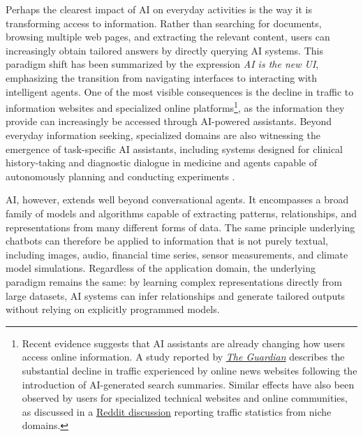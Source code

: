 Perhaps the clearest impact of AI on everyday activities is the way it is transforming access to information. Rather than searching for documents, browsing multiple web pages, and extracting the relevant content, users can increasingly obtain tailored answers by directly querying AI systems. This paradigm shift has been summarized by the expression \textit{AI is the new UI}, emphasizing the transition from navigating interfaces to interacting with intelligent agents. One of the most visible consequences is the decline in traffic to information websites and specialized online platforms\footnote{Recent evidence suggests that AI assistants are already changing how users access online information. A study reported by \href{https://www.theguardian.com/technology/2025/jul/24/ai-summaries-causing-devastating-drop-in-online-news-audiences-study-finds}{\textit{The Guardian}} describes the substantial decline in traffic experienced by online news websites following the introduction of AI-generated search summaries. Similar effects have also been observed by users for specialized technical websites and online communities, as discussed in a \href{https://www.reddit.com/r/ChatGPT/comments/1gklrkf/not_surprising_but_interesting_to_see_it}{Reddit discussion} reporting traffic statistics from niche domains.}, as the information they provide can increasingly be accessed through AI-powered assistants. Beyond everyday information seeking, specialized domains are also witnessing the emergence of task-specific AI assistants, including systems designed for clinical history-taking and diagnostic dialogue in medicine \citep{tu_towards_2025} and agents capable of autonomously planning and conducting experiments \citep{boiko_autonomous_2023}.

AI, however, extends well beyond conversational agents. It encompasses a broad family of models and algorithms capable of extracting patterns, relationships, and representations from many different forms of data. The same principle underlying chatbots can therefore be applied to information that is not purely textual, including images, audio, financial time series, sensor measurements, and climate model simulations. Regardless of the application domain, the underlying paradigm remains the same: by learning complex representations directly from large datasets, AI systems can infer relationships and generate tailored outputs without relying on explicitly programmed models.

